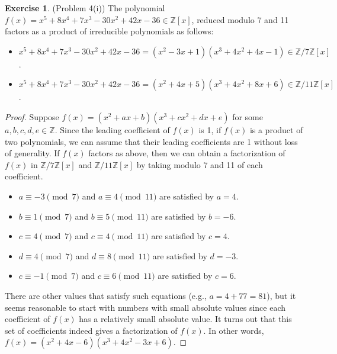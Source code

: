 \documentclass[12pt, psamsfonts]{amsart}
\theoremstyle{definition}
\newtheorem*{exer}{Exercise}
\theoremstyle{remark}
\numberwithin{equation}{section}
\begin{document}
\begin{exer}{(Problem 4(i))}
  The polynomial $f(x) = x^5 + 8x^4 + 7x^3 - 30x^2 + 42x - 36 \in \mathbb{Z}[x]$, reduced modulo 7 and 11 factors as a product of irreducible polynomials as follows:
  \begin{itemize}
    \item
      $x^5 + 8x^4 + 7x^3 - 30x^2 + 42x - 36 = (x^2 - 3x + 1)(x^3 + 4x^2 + 4x - 1) \in \mathbb{Z} / 7\mathbb{Z}[x]$.
    \item
      $x^5 + 8x^4 + 7x^3 - 30x^2 + 42x - 36 = (x^2 + 4x + 5)(x^3 + 4x^2 + 8x + 6) \in \mathbb{Z} / 11\mathbb{Z}[x]$.
  \end{itemize}
\end{exer}

\begin{proof}
  Suppose $f(x) = (x^2 + ax + b)(x^3 + cx^2 + dx + e)$ for some $a, b, c, d, e \in \mathbb{Z}$.
  Since the leading coefficient of $f(x)$ is 1, if $f(x)$ is a product of two polynomials, we can assume that their leading coefficients are 1 without loss of generality.
  If $f(x)$ factors as above, then we can obtain a factorization of $f(x)$ in $\mathbb{Z} / 7\mathbb{Z}[x]$ and $\mathbb{Z} / 11\mathbb{Z}[x]$ by taking modulo 7 and 11 of each coefficient.
  \begin{itemize}
    \item
      $a \equiv -3 \pmod 7$ and $a \equiv 4 \pmod {11}$ are satisfied by $a = 4$.
    \item
      $b \equiv 1 \pmod 7$ and $b \equiv 5 \pmod {11}$ are satisfied by $b = -6$.
    \item
      $c \equiv 4 \pmod 7$ and $c \equiv 4 \pmod {11}$ are satisfied by $c = 4$.
    \item
      $d \equiv 4 \pmod 7$ and $d \equiv 8 \pmod {11}$ are satisfied by $d = -3$.
    \item
      $c \equiv -1 \pmod 7$ and $c \equiv 6 \pmod {11}$ are satisfied by $c = 6$.
  \end{itemize}
  There are other values that satisfy such equations (e.g., $a = 4 + 77 = 81$), but it seems reasonable to start with numbers with small absolute values since each coefficient of $f(x)$ has a relatively small absolute value.
  It turns out that this set of coefficients indeed gives a factorization of $f(x)$.
  In other words, $f(x) = (x^2 + 4x - 6)(x^3 + 4x^2 - 3x + 6)$.


\end{proof}
\end{document}
